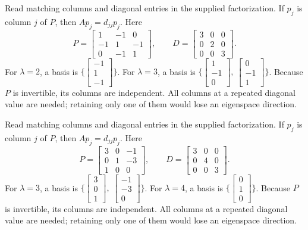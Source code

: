 Read matching columns and diagonal entries in the supplied factorization. If $p_j$ is column $j$ of $P$, then $Ap_j=d_{jj}p_j$. Here
\[P=\begin{bmatrix}1&-1&0\\-1&1&-1\\0&-1&1\end{bmatrix},\qquad D=\begin{bmatrix}3&0&0\\0&2&0\\0&0&3\end{bmatrix}.\]
For $\lambda=2$, a basis is $\{\begin{bmatrix}-1\\1\\-1\end{bmatrix}\}$.
For $\lambda=3$, a basis is $\{\begin{bmatrix}1\\-1\\0\end{bmatrix},\ \begin{bmatrix}0\\-1\\1\end{bmatrix}\}$.
Because $P$ is invertible, its columns are independent. All columns at a repeated diagonal value are needed; retaining only one of them would lose an eigenspace direction.

Read matching columns and diagonal entries in the supplied factorization. If $p_j$ is column $j$ of $P$, then $Ap_j=d_{jj}p_j$. Here
\[P=\begin{bmatrix}3&0&-1\\0&1&-3\\1&0&0\end{bmatrix},\qquad D=\begin{bmatrix}3&0&0\\0&4&0\\0&0&3\end{bmatrix}.\]
For $\lambda=3$, a basis is $\{\begin{bmatrix}3\\0\\1\end{bmatrix},\ \begin{bmatrix}-1\\-3\\0\end{bmatrix}\}$.
For $\lambda=4$, a basis is $\{\begin{bmatrix}0\\1\\0\end{bmatrix}\}$.
Because $P$ is invertible, its columns are independent. All columns at a repeated diagonal value are needed; retaining only one of them would lose an eigenspace direction.

